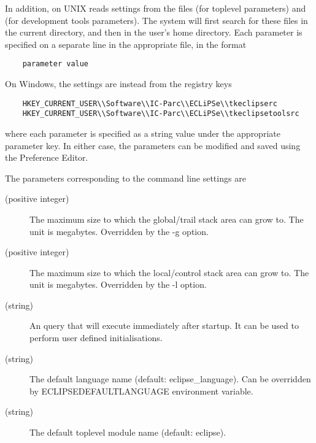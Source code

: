 In addition,  on UNIX reads settings from 
the files  (for toplevel parameters) and
 (for development tools parameters).
The system will first search for these files in the current directory,
and then in the user's home directory.
Each parameter is specified on a separate line in the appropriate
file, in the format
\begin{verbatim}
    parameter value
\end{verbatim}
On Windows, the settings are instead from the registry keys
\begin{verbatim}
    HKEY_CURRENT_USER\\Software\\IC-Parc\\ECLiPSe\\tkeclipserc
    HKEY_CURRENT_USER\\Software\\IC-Parc\\ECLiPSe\\tkeclipsetoolsrc
\end{verbatim}
where each parameter is specified as a string value under the appropriate
parameter key.
In either case, the parameters can be modified and saved using the
{\tkeclipse} Preference Editor.

The parameters corresponding to the {\eclipse} command line settings are
\begin{description}
\item[ (positive integer)]
    The maximum size to which the
    global/trail stack area can grow
    to. The unit is megabytes. 
    Overridden by the -g option.
\item[ (positive integer)]
    The maximum size to which the
    local/control stack area can grow
    to. The unit is megabytes.
    Overridden by the -l option.
\item[ (string)]
    An {\eclipse} query that {\tkeclipse}
    will execute immediately after
    startup. It can be used to perform
    user defined initialisations.
\item[ (string)]
    The default language name (default: eclipse_language).
    Can be overridden by ECLIPSEDEFAULTLANGUAGE environment variable.
\item[ (string)]
    The default toplevel module name (default: eclipse).
\end{description}

